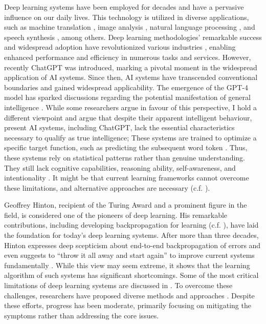 Deep learning systems have been employed for decades \cite{ivakhnenko_cybernetic_1965} and have a pervasive influence on our daily lives. This technology is utilized in diverse applications, such as machine translation \cite{dabre_survey_2021}, image analysis \cite{bhatt_cnn_2021}, natural language processing \cite{otter_survey_2021}, and speech synthesis \cite{ning_review_2019}, among others. Deep learning methodologies' remarkable success and widespread adoption have revolutionized various industries \cite{bertolini_machine_2021}, enabling enhanced performance and efficiency in numerous tasks and services.
However, recently ChatGPT \cite{liu_summary_2023} was introduced, marking a pivotal moment in the widespread application of AI systems.
Since then, AI systems have transcended conventional boundaries and gained widespread applicability. The emergence of the GPT-4 model \cite{openai_gpt-4_2023} has sparked discussions regarding the potential manifestation of general intelligence \cite{bubeck_sparks_2023}. While some researchers argue in favour of this perspective, I hold a different viewpoint and argue that despite their apparent intelligent behaviour, present AI systems, including ChatGPT, lack the essential characteristics necessary to qualify as true intelligence;
These systems are trained to optimize a specific target function, such as predicting the subsequent word token . Thus, these systems rely on statistical patterns rather than genuine understanding. They still lack cognitive capabilities, reasoning ability, self-awareness, and intentionality . It might be that current learning frameworks cannot overcome these limitations, and alternative approaches are necessary (c.f. ).

Geoffrey Hinton, recipient of the Turing Award and a prominent figure in the field, is considered one of the pioneers of deep learning.
His remarkable contributions, including developing backpropagation for learning (c.f. ), have laid the foundation for today's deep learning systems.
After more than three decades, Hinton expresses deep scepticism about end-to-end backpropagation of errors and even suggests to ``throw it all away and start again'' to improve current systems fundamentally \cite{axios_hinton}.
While this view may seem extreme, it shows that the learning algorithm of such systems has significant shortcomings.
Some of the most critical limitations of deep learning systems are discussed in .
To overcome these challenges, researchers have proposed diverse methods and approaches \cite{long_survey_2022, sager_unsupervised_2022, yarats_improving_2021}. Despite these efforts, progress has been moderate, primarily focusing on mitigating the symptoms rather than addressing the core issues.

